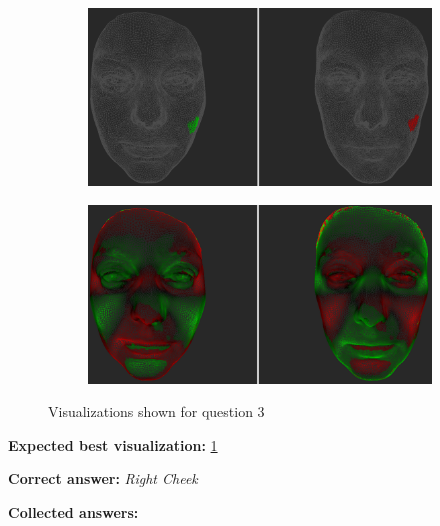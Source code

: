 \begin{figure}[h]
\begin{subfigure}{0.49\textwidth}
\includegraphics[width=\textwidth]{./img-study/pair5.PNG}
\caption{}
\label{fig:study-2-5}
\end{subfigure}
\begin{subfigure}{0.49\textwidth}
\includegraphics[width=\textwidth]{./img-study/pair7.PNG}
\caption{}
\label{fig:study-2-7}
\end{subfigure}
\caption{Visualizations shown for question 3}
\end{figure}
\medskip

{\bf Expected best visualization:} \ref{fig:study-2-5}
\medskip

{\bf Correct answer:} {\it Right Cheek}
\medskip

{\bf Collected answers:}

